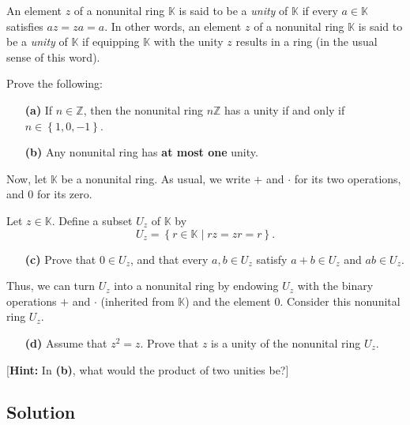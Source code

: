 \documentclass[paper=a4, fontsize=12pt]{scrartcl} %
\newcommand{\KK}{\mathbb{K}} %
\newcommand{\ZZ}{\mathbb{Z}} %
\newcommand{\set}[1]{\left\{ #1 \right\}}
\theoremstyle{plainsl}
\theoremstyle{definition}
\theoremstyle{remark}
\begin{document}
An element $z$ of a nonunital ring $\KK$ is said to be a \textit{unity}
of $\KK$ if every $a \in \KK$ satisfies $az = za = a$.
In other words, an element $z$ of a nonunital ring $\KK$ is said
to be a \textit{unity} of $\KK$ if equipping $\KK$ with the unity
$z$ results in a ring (in the usual sense of this word).

Prove the following:

\begin{enumerate}

\item[\textbf{(a)}] If $n \in \ZZ$, then the nonunital ring $n \ZZ$
has a unity if and only if $n \in \set{1, 0, -1}$.

\item[\textbf{(b)}] Any nonunital ring has \textbf{at most one} unity.

\end{enumerate}

Now, let $\KK$ be a nonunital ring.
As usual, we write $+$ and $\cdot$ for its two operations,
and $0$ for its zero.

Let $z \in \KK$. Define a subset $U_z$ of $\KK$ by
\[
U_z = \set{ r \in \KK \mid rz = zr = r }.
\]

\begin{enumerate}

\item[\textbf{(c)}] Prove that $0 \in U_z$, and that every
$a, b \in U_z$ satisfy $a + b \in U_z$ and $ab \in U_z$.

\end{enumerate}

Thus, we can turn $U_z$ into a nonunital ring by endowing $U_z$
with the binary operations $+$ and $\cdot$ (inherited from $\KK$) and
the element $0$. Consider this nonunital ring $U_z$.

\begin{enumerate}

\item[\textbf{(d)}]
Assume that $z^2 = z$.
Prove that $z$ is a unity of the nonunital ring $U_z$.

\end{enumerate}

[\textbf{Hint:} In \textbf{(b)}, what would the product of two unities be?]

\subsection{Solution}
\end{document}
